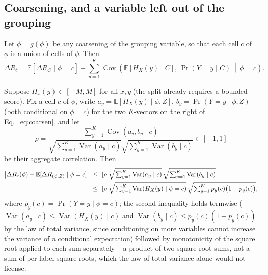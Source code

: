 \subsection{Coarsening, and a variable left out of the grouping}
\begin{proposition}\label{prop:coarsen}
Let $\bar\phi=g(\phi)$ be any coarsening of the grouping variable, so that each cell
$\bar c$ of $\bar\phi$ is a union of cells of $\phi$. Then
\begin{equation}
\Delta R_{\bar c}
=\mathbb E\!\left[\Delta R_C \mid \bar\phi=\bar c\right]
+\sum_{y=1}^K\operatorname{Cov}\!\left(\mathbb E[H_X(y)\mid C],\,
\Pr(Y=y\mid C)\ \middle|\ \bar\phi=\bar c\right).
\label{eq:coarsen}
\end{equation}
\end{proposition}

\begin{proposition}\label{prop:sensitivity}
Suppose $H_x(y)\in[-M,M]$ for all $x,y$ (the split already requires a bounded score). Fix a
cell $c$ of $\phi$, write $a_y=\mathbb E[H_X(y)\mid\phi,Z]$, $b_y=\Pr(Y=y\mid\phi,Z)$
(both conditional on $\phi=c$) for the two $K$-vectors on the right of
Eq.~\eqref{eq:coarsen}, and let
\begin{equation}
\rho=\frac{\sum_{y=1}^K\operatorname{Cov}(a_y,b_y\mid c)}
{\sqrt{\sum_{y=1}^K\operatorname{Var}(a_y\mid c)}\sqrt{\sum_{y=1}^K\operatorname{Var}(b_y\mid c)}}
\in[-1,1]
\end{equation}
be their aggregate correlation. Then
\begin{align}
\left|\Delta R_c(\phi)-\mathbb E[\Delta R_{(\phi,Z)}\mid\phi=c]\right|
&\ \le\ |\rho|\sqrt{\textstyle\sum_{y=1}^K\operatorname{Var}(a_y\mid c)}\,
\sqrt{\textstyle\sum_{y=1}^K\operatorname{Var}(b_y\mid c)}\notag\\
&\ \le\ |\rho|\sqrt{\textstyle\sum_{y=1}^K\operatorname{Var}(H_X(y)\mid\phi=c)}\,
\sqrt{\textstyle\sum_{y=1}^Kp_y(c)\bigl(1-p_y(c)\bigr)},
\label{eq:sensitivity-bound}
\end{align}
where $p_y(c)=\Pr(Y=y\mid\phi=c)$; the second inequality holds termwise
($\operatorname{Var}(a_y\mid c)\le\operatorname{Var}(H_X(y)\mid c)$ and
$\operatorname{Var}(b_y\mid c)\le p_y(c)(1-p_y(c))$ by the law of total variance, since
conditioning on more variables cannot increase the variance of a conditional
expectation) followed by monotonicity of the square root applied to each sum
separately -- a product of two square-root sums, not a sum of per-label square roots,
which the law of total variance alone would not license.
\end{proposition}

